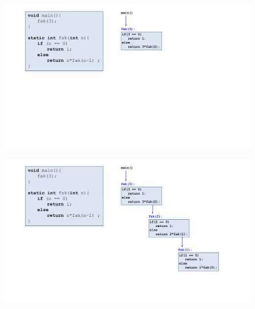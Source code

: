 \documentclass{beamer}
\begin{document}
\begin{frame}
    \begin{center}
           \includegraphics[width=1.1\textwidth]{rekursion anlage/07_Rekursion-04.png}
    \end{center}
\end{frame}
\begin{frame}
    \begin{center}
           \includegraphics[width=1.1\textwidth]{rekursion anlage/07_Rekursion-06.png}
    \end{center}
\end{frame}
\end{document}
